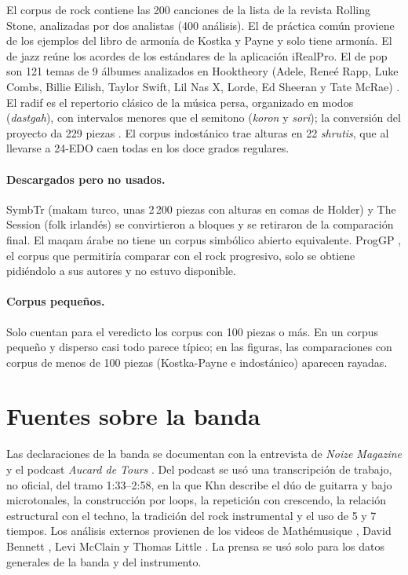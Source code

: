 El corpus de rock contiene las 200 canciones de la lista de la revista Rolling Stone, analizadas por dos analistas (400
análisis). El de práctica común proviene de los ejemplos del libro de armonía de Kostka y Payne y solo tiene armonía. El
de jazz reúne los acordes de los estándares de la aplicación iRealPro. El de pop son 121 temas de 9 álbumes analizados
en Hooktheory (Adele, Reneé Rapp, Luke Combs, Billie Eilish, Taylor Swift, Lil Nas X, Lorde, Ed Sheeran y Tate McRae)
\citep{hooktheory}. El
radif es el repertorio clásico de la música persa, organizado en modos (\emph{dastgah}), con intervalos menores que el
semitono (\emph{koron} y \emph{sori}); la conversión del proyecto da 229 piezas \citep{kanani2025}. El corpus indostánico
trae alturas en 22 \emph{shrutis}, que al llevarse a 24-EDO caen todas en los doce grados regulares.

\paragraph{Descargados pero no usados.} SymbTr (makam turco, unas 2\,200 piezas con alturas en comas de Holder)
\citep{karaosmanoglu2012} y The Session (folk irlandés) se convirtieron a bloques y se retiraron de la comparación
final. El maqam árabe no tiene un corpus simbólico abierto equivalente. ProgGP \citep{loth2023}, el corpus que permitiría
comparar con el rock progresivo, solo se obtiene pidiéndolo a sus autores y no estuvo disponible.

\paragraph{Corpus pequeños.} Solo cuentan para el veredicto los corpus con 100 piezas o más. En un corpus pequeño y
disperso casi todo parece típico; en las figuras, las comparaciones con corpus de menos de 100 piezas (Kostka-Payne e
indostánico) aparecen rayadas.

\section{Fuentes sobre la banda}

Las declaraciones de la banda se documentan con la entrevista de \emph{Noize Magazine} \citep{noize} y el podcast
\emph{Aucard de Tours} \citep{aucard2026}. Del podcast se usó una transcripción de trabajo, no oficial, del tramo
1:33--2:58, en la que Khn describe el dúo de guitarra y bajo microtonales, la construcción por loops, la repetición con
crescendo, la relación estructural con el techno, la tradición del rock instrumental y el uso de 5 y 7 tiempos. Los
análisis externos provienen de los videos de Mathémusique \citep{mathemusique2026}, David Bennett \citep{bennett2026},
Levi McClain \citep{mcclain2026} y Thomas Little \citep{little2019}. La prensa \citep{weller2026,dunlevie2026} se usó
solo para los datos generales de la banda y del instrumento.

